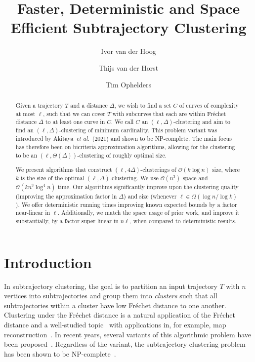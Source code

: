 \documentclass[a4paper,UKenglish,cleveref,thm-restate,notab]{lipics-v2021}
\title{Faster, Deterministic and Space Efficient Subtrajectory Clustering}
\author
{Ivor van der Hoog}
{Department of Applied Mathematics and Computer Science, Technical University of Denmark, Denmark}
{vanderhoog@gmail.com}
{https://orcid.org/0009-0006-2624-0231}
{This project has received funding from the European Union's Horizon 2020 research and innovation programme under the Marie Sk\l{}odowska-Curie grant agreement No 899987, and from the Carlsberg Foundation via Eva Rotenberg's Young Researcher Fellowship CF21-0302 ``Graph Algorithms with Geometric Applications''.}
\author
{Thijs van der Horst}
{Department of Information and Computing Sciences, Utrecht University, the Netherlands \and  Department of Mathematics and Computer Science, TU Eindhoven, the Netherlands} {t.w.j.vanderhorst@uu.nl}
{https://orcid.org/0009-0002-6987-4489}
{}
\author
{Tim Ophelders}
{Department of Information and Computing Sciences, Utrecht University, the Netherlands \and 
Department of Mathematics and Computer Science, TU Eindhoven, the Netherlands}
{t.a.e.ophelders@uu.nl}
{https://orcid.org/0000-0002-9570-024X}
{Partially supported by the Dutch Research Council (NWO) under the project number VI.Veni.212.260.}
\newcommand{\f}{Fr\'echet\xspace}
\begin{document}
\maketitle

\begin{abstract}
    Given a trajectory $T$ and a distance $\Delta$, we wish to find a set $C$ of curves of complexity at most $\ell$, such that we can cover $T$ with subcurves that each are within Fr\'echet distance $\Delta$ to at least one curve in $C$.
    We call $C$ an $(\ell,\Delta)$-clustering and aim to find an $(\ell,\Delta)$-clustering of minimum cardinality.
    This problem variant was introduced by Akitaya~\textit{et al.}~(2021) and shown to be NP-complete.
    The main focus has therefore been on bicriteria approximation algorithms, allowing for the clustering to be an $(\ell, \Theta(\Delta))$-clustering of roughly optimal size.
    
    We present algorithms that construct $(\ell,4\Delta)$-clusterings of $\mathcal{O}(k \log n)$ size, where $k$ is the size of the optimal $(\ell, \Delta)$-clustering.
    We use $\mathcal{O}(n^3)$ space and $\mathcal{O}(k n^3 \log^4 n)$ time.
    Our algorithms significantly improve upon the clustering quality (improving the approximation factor in $\Delta$) and size (whenever $\ell \in \Omega(\log n / \log k)$).
    We offer deterministic running times improving known expected bounds by a factor near-linear in $\ell$.
    Additionally, we match the space usage of prior work, and improve it substantially, by a factor super-linear in $n\ell$, when compared to deterministic results.
\end{abstract}


\section{Introduction}
\label{sec:introduction}

    In subtrajectory clustering, the goal is to partition an input trajectory $T$ with $n$ vertices into subtrajectories and group them into \emph{clusters} such that all subtrajectories within a cluster have low \f distance to one another. 
    Clustering under the \f distance is a natural application of the \f distance and a well-studied topic~\cite{driemel2016clustering, cheng2023curve, buchin2022coresets, buchin2019approximating, gudmundsson2022cubic} with applications in, for example, map reconstruction~\cite{buchin2017clustering, buchin_improved_2020}. 
    In recent years, several variants of this algorithmic problem have been proposed~\cite{buchin_detecting_2011, agarwal_subtrajectory_2018, bruning_subtrajectory_2023, bruning_faster_2022}. Regardless of the variant, the subtrajectory clustering problem has been shown to be NP-complete~\cite{buchin_detecting_2011, agarwal_subtrajectory_2018, bruning_subtrajectory_2023}.
\end{document}
